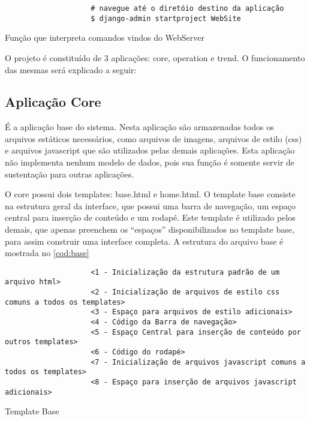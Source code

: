 				\begin{listing}[!htb]
					\begin{verbatim}
					# navegue até o diretóio destino da aplicação
					$ django-admin startproject WebSite
					\end{verbatim}
					\caption{Função que interpreta comandos vindos do WebServer}
					\label{cod:start_project}
				\end{listing}
			
				O projeto é constituído de 3 aplicações: core, operation e trend. O funcionamento das mesmas será explicado a seguir:
			
			\subsection{Aplicação Core}
				É a aplicação base do sistema. Nesta aplicação são armazenadas todos os arquivos estáticos necessários, como arquivos de imagens, arquivos de estilo (css) e arquivos javascript que são utilizados pelas demais aplicações. Esta aplicação não implementa nenhum modelo de dados, pois sua função é somente servir de sustentação para outras aplicações.
				
				O core possui dois templates: base.html e home.html. O template base consiste na estrutura geral da interface, que possui uma barra de navegação, um espaço central para inserção de conteúdo e um rodapé. Este template é utilizado pelos demais, que apenas preenchem os ``espaços'' disponibilizados no template base, para assim construir uma interface completa. A estrutura do arquivo base é mostrada no \autoref{cod:base}
				
				\begin{listing}[!htb]
					\begin{verbatim}
					<1 - Inicialização da estrutura padrão de um arquivo html>
					<2 - Inicialização de arquivos de estilo css comuns a todos os templates>
					<3 - Espaço para arquivos de estilo adicionais>
					<4 - Código da Barra de navegação>
					<5 - Espaço Central para inserção de conteúdo por outros templates>
					<6 - Código do rodapé>
					<7 - Inicialização de arquivos javascript comuns a todos os templates>
					<8 - Espaço para inserção de arquivos javascript adicionais>
					\end{verbatim}
					\caption{Template Base}
					\label{cod:base}
				\end{listing}
				
